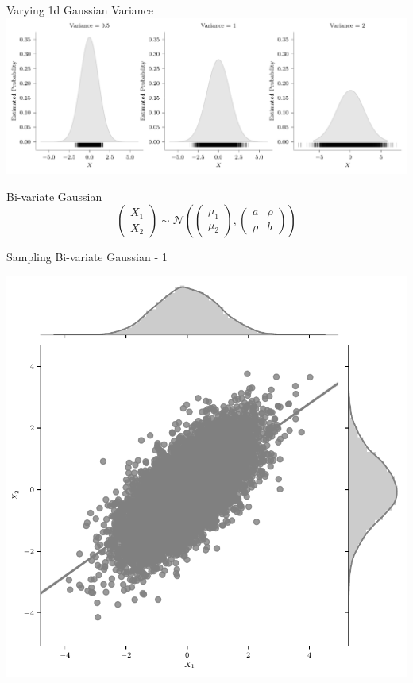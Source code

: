\documentclass{beamer}
\begin{document}
  \begin{frame}{Varying 1d Gaussian Variance}
\includegraphics[width=\linewidth,height=\textheight,keepaspectratio]{gp/1d-gp-kde2}\end{frame}

\begin{frame}{Bi-variate Gaussian}
$$
\begin{pmatrix}
X_1 \\
X_2
\end{pmatrix}  \sim \mathcal{N} \left( \begin{pmatrix}
\mu_1 \\
\mu_2
\end{pmatrix} , \begin{pmatrix}
a &\rho \\
\rho & b
\end{pmatrix} \right)
$$
\end{frame}

\begin{frame}{Sampling Bi-variate Gaussian - 1}
\begin{center}
	\includegraphics[height=\textheight -10pt ,keepaspectratio]{gp/2d-gp}
\end{center}
\end{frame}
\end{document}
